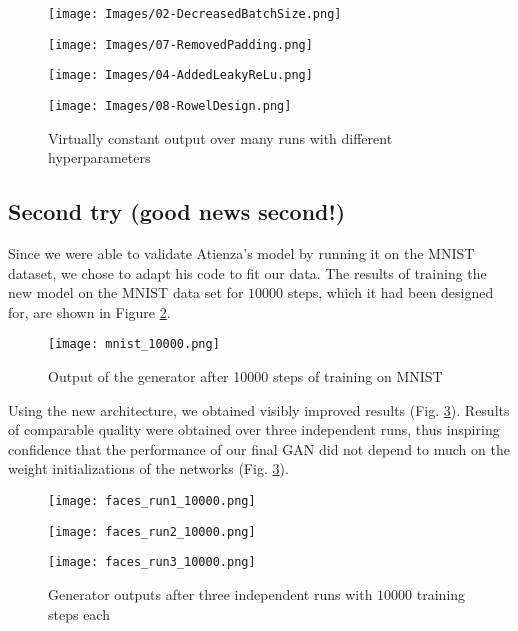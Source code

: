 \documentclass[11pt]{article}
\begin{document}
\begin{figure}[h]
 \centering
 \begin{minipage}[b]{0.2\textwidth}
   \texttt{[image: Images/02-DecreasedBatchSize.png]}
 \end{minipage}
   \begin{minipage}[b]{0.2\textwidth}
   \texttt{[image: Images/07-RemovedPadding.png]}
 \end{minipage}
   \begin{minipage}[b]{0.2\textwidth}
   \texttt{[image: Images/04-AddedLeakyReLu.png]}
 \end{minipage}
     \begin{minipage}[b]{0.2\textwidth}
   \texttt{[image: Images/08-RowelDesign.png]}
 \end{minipage}
 \caption{Virtually constant output over many runs with different hyperparameters}
 \label{fig:fail}
\end{figure}

\subsection{Second try (good news second!)}
Since we were able to validate Atienza's model by running it on the MNIST dataset, we chose to adapt his code to fit our data. The results of training the new model on the MNIST data set for $10000$ steps, which it had been designed for, are shown in Figure \ref{fig:mnist}.

\clearpage

\begin{figure}[ht]
   \centering
   \texttt{[image: mnist\_10000.png]}
   \caption{Output of the generator after 10000 steps of training on MNIST}
   \label{fig:mnist}
\end{figure}

Using the new architecture, we obtained visibly improved results (Fig. \ref{fig:gen}). Results of comparable quality were obtained over three independent runs, thus inspiring confidence that the performance of our final GAN did not depend to much on the weight initializations of the networks (Fig. \ref{fig:gen}).

\begin{figure}[ht]
 \centering
 \begin{minipage}[b]{0.3\textwidth}
   \texttt{[image: faces\_run1\_10000.png]}
 \end{minipage}
   \begin{minipage}[b]{0.3\textwidth}
   \texttt{[image: faces\_run2\_10000.png]}
 \end{minipage}
   \begin{minipage}[b]{0.3\textwidth}
   \texttt{[image: faces\_run3\_10000.png]}
 \end{minipage}
 \caption{Generator outputs after three independent runs with $10000$ training steps each}
 \label{fig:gen}
\end{figure}
\end{document}
